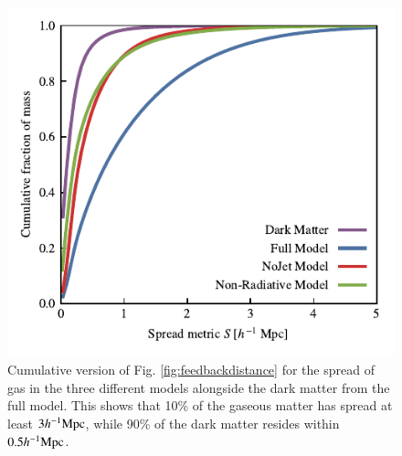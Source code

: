 \begin{figure}
    \centering
    \includegraphics{figures/cumulative_histogram_comparison.pdf}
    \vspace{-0.7cm}
    \caption{Cumulative version of Fig. \ref{fig:feedbackdistance} for the spread of gas
    in the three different models alongside the dark matter from the full model.
    This shows that 10\% of the gaseous matter has spread at least $3h^{-1}{\rm Mpc}{}$,
    while 90\% of the dark matter resides within $0.5 h^{-1}{\rm Mpc}{}$.}
    \label{fig:cumulativehistogram}
\end{figure}

